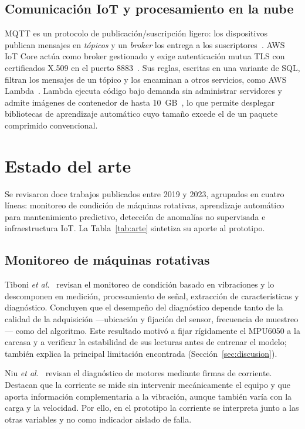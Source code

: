\documentclass[10pt,twocolumn]{article}
\begin{document}
\subsection{Comunicación IoT y procesamiento en la nube}
MQTT es un protocolo de publicación/suscripción ligero: los dispositivos publican mensajes en
\emph{tópicos} y un \emph{broker} los entrega a los suscriptores~\cite{mqtt311,mishra2020}. AWS IoT
Core actúa como broker gestionado y exige autenticación mutua TLS con certificados X.509 en el
puerto 8883~\cite{awsiot}. Sus reglas, escritas en una variante de SQL, filtran los mensajes de un
tópico y los encaminan a otros servicios, como AWS Lambda~\cite{awsrules}. Lambda ejecuta código
bajo demanda sin administrar servidores y admite imágenes de contenedor de hasta
10~GB~\cite{awslambda}, lo que permite desplegar bibliotecas de aprendizaje automático cuyo
tamaño excede el de un paquete comprimido convencional.

\section{Estado del arte}
\label{sec:arte}

Se revisaron doce trabajos publicados entre 2019 y 2023, agrupados en cuatro líneas: monitoreo de
condición de máquinas rotativas, aprendizaje automático para mantenimiento predictivo, detección
de anomalías no supervisada e infraestructura IoT. La Tabla~\ref{tab:arte} sintetiza su aporte al
prototipo.

\subsection{Monitoreo de máquinas rotativas}

Tiboni \emph{et al.}~\cite{tiboni2022} revisan el monitoreo de condición basado en vibraciones y
lo descomponen en medición, procesamiento de señal, extracción de características y diagnóstico.
Concluyen que el desempeño del diagnóstico depende tanto de la calidad de la adquisición
---ubicación y fijación del sensor, frecuencia de muestreo--- como del algoritmo. Este resultado
motivó a fijar rígidamente el MPU6050 a la carcasa y a verificar la estabilidad de sus lecturas
antes de entrenar el modelo; también explica la principal limitación encontrada (Sección~\ref{sec:discusion}).

Niu \emph{et al.}~\cite{niu2023} revisan el diagnóstico de motores mediante firmas de corriente.
Destacan que la corriente se mide sin intervenir mecánicamente el equipo y que aporta información
complementaria a la vibración, aunque también varía con la carga y la velocidad. Por ello, en el
prototipo la corriente se interpreta junto a las otras variables y no como indicador aislado de
falla.
\end{document}
